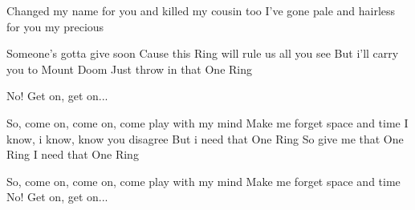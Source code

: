 \documentclass[../../../songbook.tex]{subfiles}
\begin{document}
{Changed my name for you 			 \newline
and killed my cousin too			 \newline
I've gone pale and hairless 			 \newline
for you my precious			 \newline

Someone's gotta give soon			 \newline
Cause this Ring will rule us all you see			 \newline
But i'll carry you to Mount Doom			 \newline
Just throw in that One Ring			 \newline

\-\hspace{1cm} No! Get on, get on...		 \newline

\-\hspace{1cm} So, come on, come on, come play with my mind	 \newline
\-\hspace{1cm} Make me forget space and time			 \newline
\-\hspace{1cm} I know, i know, know you disagree			\newline
\-\hspace{1cm} But i need that One Ring				\newline
\-\hspace{1cm} So give me that One Ring				\newline
\-\hspace{1cm} I need that One Ring				\newline

\-\hspace{1cm} So, come on, come on, come play with my mind			 \newline
\-\hspace{1cm} Make me forget space and time			 \newline
\-\hspace{1cm} No! Get on, get on...			 \newline
}
\end{document}
